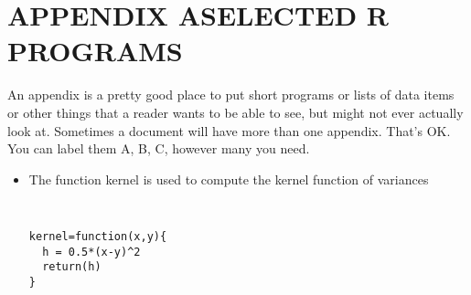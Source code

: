 \chapter{\texorpdfstring{APPENDIX A\hspace{1em}SELECTED R PROGRAMS}{APPENDIX A}}

An appendix is a pretty good place to put short programs or lists of data items or other things that a reader wants to be able to see, but might not ever actually look at.
Sometimes a document will have more than one appendix.
That's OK.
You can label them A, B, C, however many you need.

\begin{itemize}
\item The function kernel is used to compute the kernel function of variances
{\small \tt
\begin{verbatim}
kernel=function(x,y){
  h = 0.5*(x-y)^2
  return(h)
}
\end{verbatim}
}
\end{itemize}


\pagebreak  %
